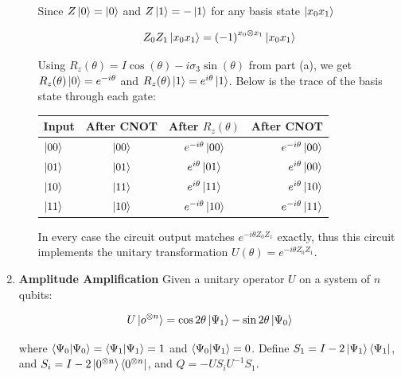 \documentclass[11pt]{article}
\begin{document}
\begin{enumerate}
\begin{enumerate}
		            Since $Z\ket{0} = \ket{0}$ and $Z\ket{1} = -\ket{1}$ for any basis state $\ket{x_0 x_1}$

		            \begin{equation*}
			            Z_0 Z_1 \ket{x_0 x_1} = {(-1)}^{x_0 \otimes x_1} \ket{x_0 x_1}
		            \end{equation*}

		            Using $R_z(\theta) = I \cos(\theta) - i \sigma_3 \sin(\theta)$ from part (a), we get $R_z(\theta)\ket{0} = e^{-i \theta}$ and $R_z(\theta)\ket{1} = e^{i\theta}\ket{1}$. Below is the trace of the basis state through each gate:

		            \centering
		            \begin{tabular}{l c c r}
			            Input      & After CNOT & After $R_z(\theta)$     & After CNOT              \\
			            \hline
			            $\ket{00}$ & $\ket{00}$ & $e^{-i \theta}\ket{00}$ & $e^{-i \theta}\ket{00}$ \\
			            $\ket{01}$ & $\ket{01}$ & $e^{i \theta}\ket{01}$  & $e^{i \theta}\ket{00}$  \\
			            $\ket{10}$ & $\ket{11}$ & $e^{i \theta}\ket{11}$  & $e^{i \theta}\ket{10}$  \\
			            $\ket{11}$ & $\ket{10}$ & $e^{-i \theta}\ket{10}$ & $e^{-i \theta}\ket{11}$ \\
		            \end{tabular}

		            In every case the circuit output matches $e^{-i \theta Z_0 Z_1}$ exactly, thus this circuit implements the unitary transformation $U(\theta) = e^{-i \theta Z_0 Z_1}$.

	      \end{enumerate}

	\item \textbf{Amplitude Amplification} Given a unitary operator $U$ on a system of $n$ qubits:

	      \begin{align*}
		      U\ket{o^{\otimes n}} = \cos 2\theta \ket{\Psi_1} - \sin 2\theta \ket{\Psi_0}
	      \end{align*}

	      where $\braket{\Psi_0 | \Psi_0} = \braket{\Psi_1 | \Psi_1} = 1$ and $\braket{\Psi_0 | \Psi_1} = 0$. Define $S_1 = I - 2 \ket{\Psi_1} \bra{\Psi_1}$, and $S_i = I - 2 \ket{0^{\otimes n}} \bra{0^{\otimes n}}$, and $Q = -US_i U^{-1}S_1$.


\end{enumerate}
\end{document}
